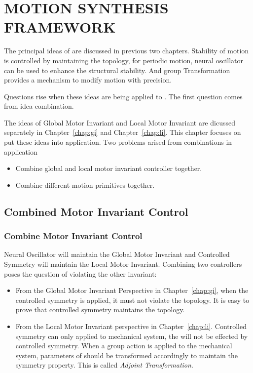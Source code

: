 \chapter {MOTION SYNTHESIS FRAMEWORK}
\label{chap:msf}
\graphicspath{{CombineFramework/CombineFrameworkFigs/EPS/}{CombineFramework/CombineFrameworkFigs/}}
The principal ideas of \moit are discussed in previous two chapters.
Stability of motion is controlled by maintaining the topology, 
for periodic motion, neural oscillator can be used to enhance the structural stability.
And group Transformation provides a mechanism to modify motion with precision.


Questions rise when these ideas are being applied  to \cms.
The first question comes from idea combination.

The ideas of Global Motor Invariant and Local Motor Invariant are dicussed separately in Chapter~\ref{chap:gi} and Chapter~\ref{chap:li}.
This chapter focuses on put these ideas into \cms application.
Two problems arised from combinations in application
\begin{itemize}
	\item Combine global and local motor invariant controller together.
	\item Combine different motion primitives together.
\end{itemize}

\section{Combined Motor Invariant Control}

\subsection{ Combine Motor Invariant Control}

Neural Oscillator will maintain the Global Motor Invariant and Controlled Symmetry will maintain the Local Motor Invariant.
Combining two controllers poses the question of violating the other invariant:
\begin{itemize}
\item From the Global Motor Invariant Perspective in Chapter~\ref{chap:gi},
when the controlled symmetry  is applied, it must not violate the topology. 
It is easy to prove that controlled symmetry maintains the topology.

\item From the Local Motor Invariant perspective in Chapter~\ref{chap:li}.
Controlled symmetry can only applied to mechanical system, the \cpg will not be effected by controlled symmetry.
When a group action is applied to the mechanical system, parameters of \cpg should be transformed accordingly to maintain the symmetry property.
This is called \emph{Adjoint Transformation}.
\end{itemize}


